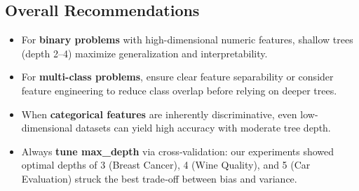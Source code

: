 \subsection{Overall Recommendations}
\begin{itemize}
	\item For \textbf{binary problems} with high-dimensional numeric features, shallow trees (depth 2–4) maximize generalization and interpretability.
	\item For \textbf{multi-class problems}, ensure clear feature separability or consider feature engineering to reduce class overlap before relying on deeper trees.
	\item When \textbf{categorical features} are inherently discriminative, even low-dimensional datasets can yield high accuracy with moderate tree depth.
	\item Always \textbf{tune max\_depth} via cross‑validation: our experiments showed optimal depths of 3 (Breast Cancer), 4 (Wine Quality), and 5 (Car Evaluation) struck the best trade‑off between bias and variance.
\end{itemize}
